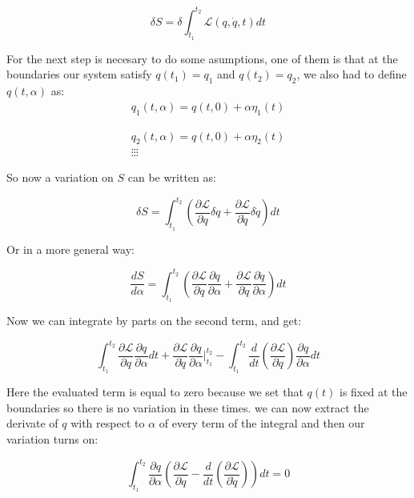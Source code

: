 \documentclass[9pt,a4paper,twocolumn,twoside]{rho-class/rho}
\begin{document}
\begin{equation}
    \delta S = \delta  \int_{t_1}^{t_2} \mathcal{L}(q,\dot{q},t)dt  
\end{equation}

For the next step is necesary to do some asumptions, one of them is that at the boundaries our system satisfy $q(t_1) =  q_1$ and $ q(t_2) = q_2$, we also had to define $q(t,\alpha)$ as:
\newpage 
\begin{align}
q_1(t,\alpha) = q(t,0) + \alpha\eta_1(t)
\end{align}

\begin{align*}
q_2(t,\alpha) = q(t,0) + \alpha\eta_2(t)\\
\vdots \vdots \vdots   
\end{align*}

So now a variation on $S$ can be written as:

\begin{equation}
\delta S = \int_{t_1}^{t_2} (\frac{\partial\mathcal{L}}{\partial q}\delta q + \frac{\partial \mathcal{L}}{\partial \dot{q}}\delta \dot{q})dt  
\end{equation}

Or in a more general way:

\begin{equation*}
    \frac{dS}{d\alpha} = \int_{t_1}^{t_2} (\frac{\partial\mathcal{L}}{\partial q}\frac{\partial{q}}{\partial \alpha} + \frac{\partial \mathcal{L}}{\partial \dot{q}}\frac{\partial \dot{q}}{\partial \alpha})dt  
\end{equation*}

Now we can integrate by parts on the second term, and get:

\begin{equation*} 
    \int_{t_1}^{t_2} \frac{\partial\mathcal{L}}{\partial q}\frac{\partial{q}}{\partial \alpha}dt +  \frac{\partial \mathcal L}{\partial \dot{q}}\frac{\partial q}{\partial \alpha}\Big|_{t_1}^{t_2} - \int_{t_1}^{t_2} \frac{d}{dt}(\frac{\partial \mathcal{L}}{\partial \dot{q}})\frac{\partial q}{\partial \alpha}dt
\end{equation*}



Here the evaluated term is equal to zero because we set that $q(t)$ is fixed at the boundaries so there is no variation in these times. we can now extract the derivate of $q$ with respect to $\alpha$ of every term of the integral and then our variation turns on:

\begin{equation*}
   \int_{t_1}^{t_2} \frac{\partial q}{\partial \alpha} (\frac{\partial \mathcal{L}}{\partial q}-\frac{d}{dt}(\frac{\partial \mathcal{L}}{\partial \dot{q}}))dt = 0
\end{equation*} 
\end{document}
